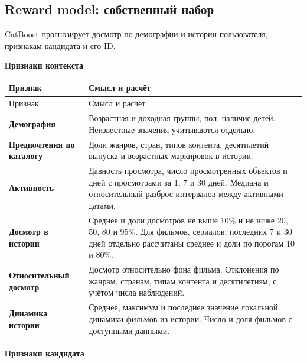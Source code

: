 \documentclass[11pt,a4paper]{article}
\begin{document}
\newpage

\subsection{Reward model: собственный набор}

CatBoost прогнозирует досмотр по демографии и истории пользователя, признакам кандидата и его ID.

\textbf{Признаки контекста}

\begin{longtable}{>{\raggedright\arraybackslash}p{4.1cm}>{\raggedright\arraybackslash}p{10.8cm}}
\toprule
Признак & Смысл и расчёт \\
\midrule
\endfirsthead
\toprule
Признак & Смысл и расчёт \\
\midrule
\endhead
\textbf{Демография} & Возрастная и доходная группы, пол, наличие детей. Неизвестные значения учитываются отдельно. \\[4pt]
\textbf{Предпочтения по каталогу} & Доли жанров, стран, типов контента, десятилетий выпуска и возрастных маркировок в истории. \\[4pt]
\textbf{Активность} & Давность просмотра, число просмотренных объектов и дней с просмотрами за 1, 7 и 30 дней. Медиана и относительный разброс интервалов между активными датами. \\[4pt]
\textbf{Досмотр в истории} & Среднее и доли досмотров не выше 10\% и не ниже 20, 50, 80 и 95\%. Для фильмов, сериалов, последних 7 и 30 дней отдельно рассчитаны среднее и доли по порогам 10 и 80\%. \\[4pt]
\textbf{Относительный досмотр} & Досмотр относительно фона фильма. Отклонения по жанрам, странам, типам контента и десятилетиям, с учётом числа наблюдений. \\[4pt]
\textbf{Динамика истории} & Среднее, максимум и последнее значение локальной динамики фильмов из истории. Число и доля фильмов с доступными данными. \\[4pt]
\bottomrule
\end{longtable}

\textbf{Признаки кандидата}
\end{document}
